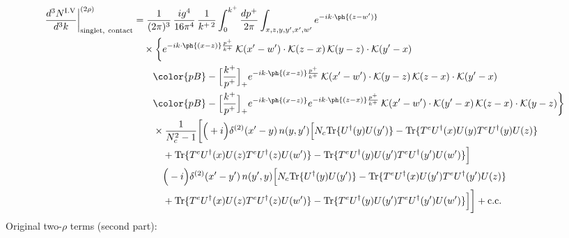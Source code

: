 \begin{align}
\frac{d^{3}N^{\rm I.V}}{d^{3}k}\bigg|^{(2\rho)}_{\rm singlet,\ contact}&=\frac{1}{(2\pi)^{3}}\,\frac{ig^{4}}{16\pi^{4}}\,\frac{1}{k^{+\,2}}\int_{0}^{k^{+}}\frac{dp^{+}}{2\pi}\int_{x,z,y,y',x',w'}e^{-ik\cdot\ph{(z-w')}}\notag\\
&\quad\times\bigg\{e^{-ik\cdot\ph{(x-z)}\frac{p^{+}}{k^{+}}}\,\mathcal{K}(x'-w')\cdot\mathcal{K}(z-x)\,\mathcal{K}(y-z)\cdot\mathcal{K}(y'-x)\notag\\
&\qquad{\color{pB}-\Big[\frac{k^{+}}{p^{+}}\Big]_{+}e^{-ik\cdot\ph{(x-z)}\frac{p^{+}}{k^{+}}}\,\mathcal{K}(x'-w')\cdot\mathcal{K}(y-z)\,\mathcal{K}(z-x)\cdot\mathcal{K}(y'-x)}\notag\\
&\qquad{\color{pB}-\Big[\frac{k^{+}}{p^{+}}\Big]_{+}e^{-ik\cdot\ph{(x-z)}}e^{-ik\cdot\ph{(z-x)}\frac{p^{+}}{k^{+}}}\,\mathcal{K}(x'-w')\cdot\mathcal{K}(y'-x)\,\mathcal{K}(z-x)\cdot\mathcal{K}(y-z)}\bigg\}\notag\\
&\qquad\times \frac{1}{N_{c}^{2}-1}\bigg[\Big(+i\Big)\delta^{(2)}(x'-y)\,n(y,y')\Big[N_{c}{\rm Tr}\{U^{\dagger}(y)U(y')\}-{\rm Tr}\{T^{e}U^{\dagger}(x)U(y)T^{e}U^{\dagger}(y)U(z)\}\notag\\
&\qquad\quad +{\rm Tr}\{T^{e}U^{\dagger}(x)U(z)T^{e}U^{\dagger}(z)U(w')\}-{\rm Tr}\{T^{e}U^{\dagger}(y)U(y')T^{e}U^{\dagger}(y')U(w')\}\Big]\notag\\
&\qquad\quad \Big(-i\Big)\delta^{(2)}(x'-y')\,n(y',y)\Big[N_{c}{\rm Tr}\{U^{\dagger}(y)U(y')\}-{\rm Tr}\{T^{e}U^{\dagger}(x)U(y')T^{e}U^{\dagger}(y')U(z)\}\notag\\
&\qquad\quad +{\rm Tr}\{T^{e}U^{\dagger}(x)U(z)T^{e}U^{\dagger}(z)U(w')\}-{\rm Tr}\{T^{e}U^{\dagger}(y)U(y')T^{e}U^{\dagger}(y')U(w')\}\Big]\bigg]+{\rm c.c.}\label{eq:E-I.V-2}
\end{align}
Original two-$\rho$ terms (second part):
